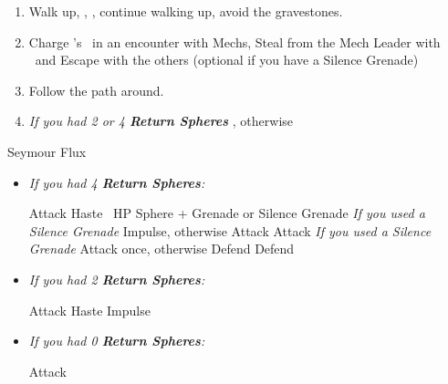 \begin{enumerate}[resume]
    \item Walk up, \sd, \cs[1:20], continue walking up, avoid the gravestones.
    \item Charge \rikku's \od\ in an encounter with Mechs, Steal from the Mech Leader with \rikku\ and Escape with the others (optional if you have a Silence Grenade)
    \item Follow the path around.
    \item \textit{If you had 2 or 4 \textbf{Return Spheres}} \formation{\tidus}{\yuna}{\auron}, otherwise \formation{\tidus}{\kimahri}{\wakka}
\end{enumerate}
\begin{battle}[70000]{Seymour Flux}
    \begin{itemize}
        \item \textit{If you had 4 \textbf{Return Spheres}:}
            \begin{itemize}
                \yunaf Attack
                \tidusf Haste \yuna
                \switch{\auron}{\rikku}
                \rikkuf \od\ HP Sphere + Grenade or Silence Grenade
                \summon{\bahamut}
                \bahamutf \textit{If you used a Silence Grenade} Impulse, otherwise Attack
                \yunaf Attack
                \tidusf \textit{If you used a Silence Grenade} Attack once, otherwise Defend
                \rikkuf Defend
            \end{itemize}
        \item \textit{If you had 2 \textbf{Return Spheres}:}
            \begin{itemize}
                \yunaf Attack
                \tidusf Haste \yuna
                \summon{\bahamut}
                \bahamutf Impulse
            \end{itemize}        
        \item \textit{If you had 0 \textbf{Return Spheres}:}
            \begin{itemize}
                \switch{\tidus}{\yuna}
                \summon{\bahamut}
                \bahamutf Attack
            \end{itemize}
    \end{itemize}
\end{battle}
